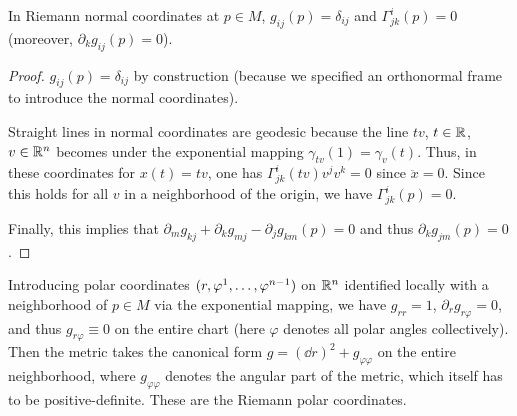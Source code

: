 \begin{prop}
    In Riemann normal coordinates at $p\in M$, $g_{ij}(p)=\delta_{ij}$ and $\Gamma^i_{jk}(p)=0$ (moreover, $\partial_k g_{ij}(p)=0$).
\end{prop}
\begin{proof}
    $g_{ij}(p)=\delta_{ij}$ by construction (because we specified an orthonormal frame to introduce the normal coordinates).
    
    Straight lines in normal coordinates are geodesic because the line $tv$, $t\in\mathbb{R} $, $v\in\mathbb{R}^n$ becomes under the exponential mapping $\gamma_{tv}(1)=\gamma_v(t)$. Thus, in these coordinates for $x(t)=tv$, one has $\Gamma^i_{jk}(tv)v^jv^k=0$ since $\ddot x=0$. Since this holds for all $v$ in a neighborhood of the origin, we have $\Gamma^i_{jk}(p)=0$. 
    
    Finally, this implies that $\partial_m g_{kj}+\partial_k g_{mj}-\partial_j g_{km}(p)=0$ and thus $\partial_k g_{jm}(p)=0$.
\end{proof}



\begin{defn}
    Introducing polar coordinates $(\tuple{r,\varphi^1,\ldots,\varphi^{n-1}})$ on $\mathbb{R}^n$ identified locally with a neighborhood of $p\in M$ via the exponential mapping, we have $g_{rr}=1$, $\partial_r g_{r\varphi}=0$, and thus $g_{r\varphi}\equiv 0$ on the entire chart (here $\varphi$ denotes all polar angles collectively). Then the metric takes the canonical form $g=(\dd r)^2+g_{\varphi\varphi}$ on the entire neighborhood, where $g_{\varphi\varphi}$ denotes the angular part of the metric, which itself has to be positive-definite. These are the Riemann polar coordinates.
\end{defn}

